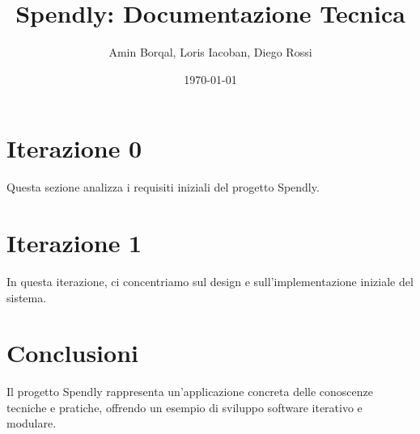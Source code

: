 \documentclass{softwaredoc}
\title{Spendly: Documentazione Tecnica}
\author{Amin Borqal, Loris Iacoban, Diego Rossi}
\date{\today}
\begin{document}
\maketitle

\tableofcontents
\listoffigures
\listoftables
\newpage

\section*{Iterazione 0}
Questa sezione analizza i requisiti iniziali del progetto Spendly.






\newpage



\newpage
\section*{Iterazione 1}
In questa iterazione, ci concentriamo sul design e sull'implementazione iniziale del sistema.
\section*{Conclusioni}
Il progetto Spendly rappresenta un'applicazione concreta delle conoscenze tecniche e pratiche, offrendo un esempio di sviluppo software iterativo e modulare.
\end{document}
